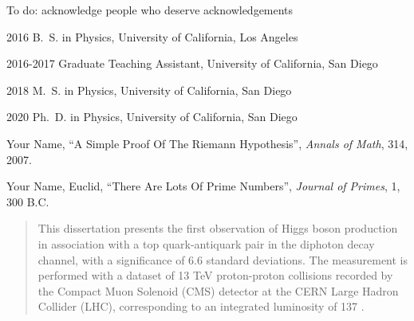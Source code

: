 \begin{frontmatter}
%
%
\begin{acknowledgements}
 To do: acknowledge people who deserve acknowledgements
\end{acknowledgements}


%
%
\begin{vitapage}
\begin{vita}
  \item[2016] B.~S. in Physics, University of California, Los Angeles
  \item[2016-2017] Graduate Teaching Assistant, University of California, San Diego
  \item[2018] M.~S. in Physics, University of California, San Diego
  \item[2020] Ph.~D. in Physics, University of California, San Diego
\end{vita}
\begin{publications}
  \item Your Name, ``A Simple Proof Of The Riemann Hypothesis'', \emph{Annals of Math}, 314, 2007.
  \item Your Name, Euclid, ``There Are Lots Of Prime Numbers'', \emph{Journal of Primes}, 1, 300 B.C.
\end{publications}
\end{vitapage}


%
%
\begin{abstract}
  This dissertation presents the first observation of Higgs boson production in association with a top quark-antiquark pair in the diphoton decay channel, with a significance of 6.6 standard deviations.
  The measurement is performed with a dataset of 13 TeV proton-proton collisions recorded by the Compact Muon Solenoid (CMS) detector at the CERN Large Hadron Collider (LHC), corresponding to an integrated luminosity of 137 \fbinv.

\end{abstract}


\end{frontmatter}
